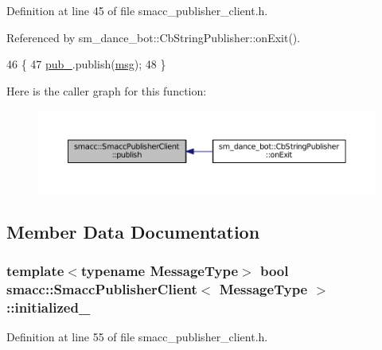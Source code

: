 Definition at line 45 of file smacc\+\_\+publisher\+\_\+client.\+h.



Referenced by sm\+\_\+dance\+\_\+bot\+::\+Cb\+String\+Publisher\+::on\+Exit().


\begin{DoxyCode}
46   \{
47     \hyperlink{classsmacc_1_1SmaccPublisherClient_a1ed34cdd0001bde76450ab4540b11808}{pub\_}.publish(\hyperlink{namespacekeyboard__node_a768777e12f75b89e4a0a60acf748e9eb}{msg});
48   \}
\end{DoxyCode}


Here is the caller graph for this function\+:
\nopagebreak
\begin{figure}[H]
\begin{center}
\leavevmode
\includegraphics[width=350pt]{classsmacc_1_1SmaccPublisherClient_aa635210d9104a5b6f3ea15cb2bf16518_icgraph}
\end{center}
\end{figure}




\subsection{Member Data Documentation}
\subsubsection[{\texorpdfstring{initialized\+\_\+}{initialized_}}]{\setlength{\rightskip}{0pt plus 5cm}template$<$typename Message\+Type$>$ {\bf bool} {\bf smacc\+::\+Smacc\+Publisher\+Client}$<$ Message\+Type $>$\+::initialized\+\_\+\hspace{0.3cm}{\ttfamily [private]}}\hypertarget{classsmacc_1_1SmaccPublisherClient_a89c0b50504971a936d9849cd797db79b}{}\label{classsmacc_1_1SmaccPublisherClient_a89c0b50504971a936d9849cd797db79b}


Definition at line 55 of file smacc\+\_\+publisher\+\_\+client.\+h.



